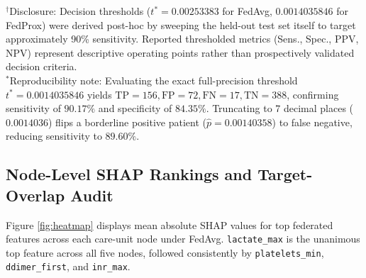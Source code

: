 \documentclass[conference,a4paper]{IEEEtran}
\begin{document}
\begin{table}[t]
\caption{Pooled classification performance on held-out test cohort ($N = 633$)}
\label{tab:fl-performance}
\centering
\small
{}
\vspace{1mm}
\begin{minipage}{\textwidth}
\scriptsize $^\dagger$Disclosure: Decision thresholds ($t^* = 0.00253383$ for FedAvg, $0.0014035846$ for FedProx) were derived post-hoc by sweeping the held-out test set itself to target approximately 90\% sensitivity. Reported thresholded metrics (Sens., Spec., PPV, NPV) represent descriptive operating points rather than prospectively validated decision criteria.\\
$^*$Reproducibility note: Evaluating the exact full-precision threshold $t^* = 0.0014035846$ yields $\text{TP} = 156, \text{FP} = 72, \text{FN} = 17, \text{TN} = 388$, confirming sensitivity of $90.17\%$ and specificity of $84.35\%$. Truncating to 7 decimal places ($0.0014036$) flips a borderline positive patient ($\hat{p} = 0.00140358$) to false negative, reducing sensitivity to $89.60\%$.
\end{minipage}
\end{table}

\subsection{Node-Level SHAP Rankings and Target-Overlap Audit}
Figure \ref{fig:heatmap} displays mean absolute SHAP values for top federated features across each care-unit node under FedAvg. \texttt{lactate\_max} is the unanimous top feature across all five nodes, followed consistently by \texttt{platelets\_min}, \texttt{ddimer\_first}, and \texttt{inr\_max}.
\end{document}

